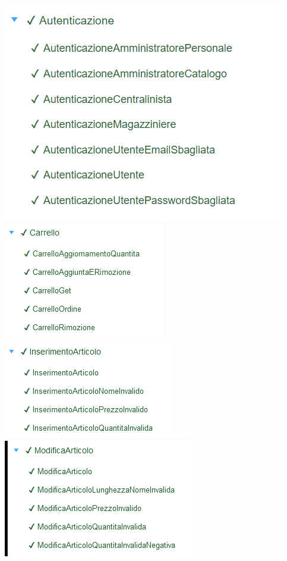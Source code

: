 \documentclass[12pt]{article}
\begin{document}
\begin{multicols}{2}
\includegraphics[scale=0.45]{autenticazione} \\


\includegraphics[scale=0.45]{carrello} \\


\includegraphics[scale=0.45]{inserimentoarticolo} \\

 \includegraphics[scale=0.45]{modificaarticolo} \\
 

\end{multicols}
\end{document}
